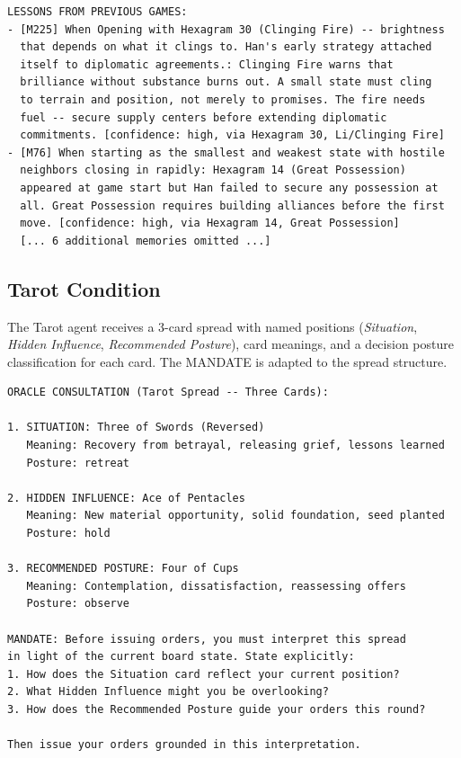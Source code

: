 \documentclass[11pt]{article}
\begin{document}
\begin{lstlisting}[caption={Example memory entries injected before the board state under the yarrow condition (game \texttt{random\_oracle\_3c96}).  Each entry is a lesson from a previous game, framed through hexagram symbolism.},label={lst:memory}]
LESSONS FROM PREVIOUS GAMES:
- [M225] When Opening with Hexagram 30 (Clinging Fire) -- brightness
  that depends on what it clings to. Han's early strategy attached
  itself to diplomatic agreements.: Clinging Fire warns that
  brilliance without substance burns out. A small state must cling
  to terrain and position, not merely to promises. The fire needs
  fuel -- secure supply centers before extending diplomatic
  commitments. [confidence: high, via Hexagram 30, Li/Clinging Fire]
- [M76] When starting as the smallest and weakest state with hostile
  neighbors closing in rapidly: Hexagram 14 (Great Possession)
  appeared at game start but Han failed to secure any possession at
  all. Great Possession requires building alliances before the first
  move. [confidence: high, via Hexagram 14, Great Possession]
  [... 6 additional memories omitted ...]
\end{lstlisting}

\subsection{Tarot Condition}
\label{app:tarot}

The Tarot agent receives a 3-card spread with named positions
(\emph{Situation}, \emph{Hidden Influence}, \emph{Recommended
Posture}), card meanings, and a decision posture classification for
each card.  The \textsc{MANDATE} is adapted to the spread structure.

\begin{lstlisting}[caption={Tarot condition injection (game \texttt{tarot\_0fa6}).},label={lst:tarot}]
ORACLE CONSULTATION (Tarot Spread -- Three Cards):

1. SITUATION: Three of Swords (Reversed)
   Meaning: Recovery from betrayal, releasing grief, lessons learned
   Posture: retreat

2. HIDDEN INFLUENCE: Ace of Pentacles
   Meaning: New material opportunity, solid foundation, seed planted
   Posture: hold

3. RECOMMENDED POSTURE: Four of Cups
   Meaning: Contemplation, dissatisfaction, reassessing offers
   Posture: observe

MANDATE: Before issuing orders, you must interpret this spread
in light of the current board state. State explicitly:
1. How does the Situation card reflect your current position?
2. What Hidden Influence might you be overlooking?
3. How does the Recommended Posture guide your orders this round?

Then issue your orders grounded in this interpretation.
\end{lstlisting}
\end{document}
